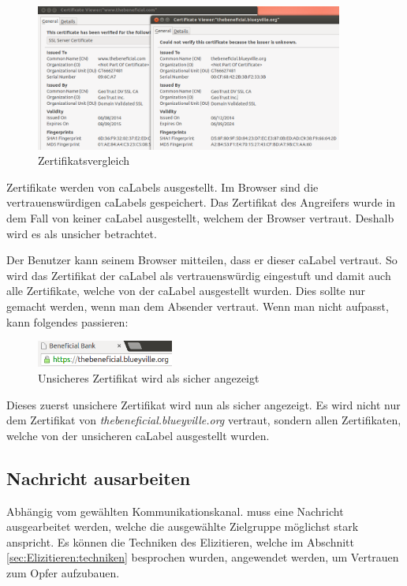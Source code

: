 \begin{figure}[H]
  \centering
  \includegraphics[width=0.9\textwidth]{images/https-certificate-comparision.png}
  \caption{Zertifikatsvergleich}
  \label{fig:phishing:angriffvorbereiten:angriffsvektoren:fakecertificates:certificatecomparison}
\end{figure}

Zertifikate werden von \Glspl{caLabel} ausgestellt. Im Browser sind die vertrauenswürdigen \Glspl{caLabel} gespeichert. Das Zertifikat des Angreifers wurde in dem Fall von keiner \Gls{caLabel} ausgestellt, welchem der Browser vertraut. Deshalb wird es als unsicher betrachtet.

Der Benutzer kann seinem Browser mitteilen, dass er dieser \Gls{caLabel} vertraut. So wird das Zertifikat der \Gls{caLabel} als vertrauenswürdig eingestuft und damit auch alle Zertifikate, welche von der \Gls{caLabel} ausgestellt wurden. Dies sollte nur gemacht werden, wenn man dem Absender vertraut. Wenn man nicht aufpasst, kann folgendes passieren:

\begin{figure}[H]
  \centering
  \includegraphics[width=0.4\textwidth]{images/https-chrome-falsesecure.png}
  \caption{Unsicheres Zertifikat wird als sicher angezeigt}
  \label{fig:phishing:angriffvorbereiten:angriffsvektoren:fakecertificates:chrome:falsesecure}
\end{figure}
Dieses zuerst unsichere Zertifikat wird nun als sicher angezeigt. Es wird nicht nur dem Zertifikat von \textit{thebeneficial.blueyville.org} vertraut, sondern allen Zertifikaten, welche von der unsicheren \Gls{caLabel} ausgestellt wurden.

\subsection{Nachricht ausarbeiten}
Abhängig vom gewählten Kommunikationskanal. muss eine Nachricht ausgearbeitet werden, welche die ausgewählte Zielgruppe möglichst stark anspricht.
Es können die Techniken des Elizitieren, welche im Abschnitt \ref{sec:Elizitieren:techniken} besprochen wurden, angewendet werden, um Vertrauen zum Opfer aufzubauen.

